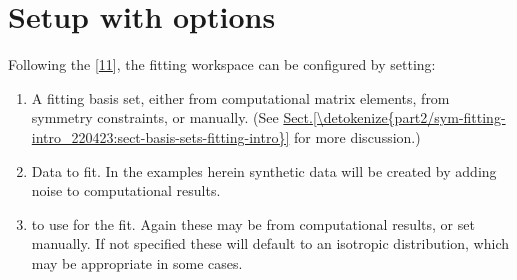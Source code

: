 \documentclass[letterpaper,table,10pt,english]{jupyterBook}
\begin{document}
\section{Setup with options}
\label{\detokenize{part2/basic_fitting_numerics_intro_260423:setup-with-options}}
\sphinxAtStartPar
Following the  {[}\hyperlink{cite.backmatter/bibliography:id617}{11}{]}, the fitting workspace can be configured by setting:
\begin{enumerate}
%
\item {} 
\sphinxAtStartPar
A fitting basis set, either from computational matrix elements, from symmetry constraints, or manually. (See \hyperref[\detokenize{part2/sym-fitting-intro_220423:sect-basis-sets-fitting-intro}]{Sect.\@ \ref{\detokenize{part2/sym-fitting-intro_220423:sect-basis-sets-fitting-intro}}} for more discussion.)

\item {} 
\sphinxAtStartPar
Data to fit. In the examples herein synthetic data will be created by adding noise to computational results.

\item {} 
\sphinxAtStartPar
{\hyperref[\detokenize{backmatter/glossary:term-ADMs}]{}} to use for the fit. Again these may be from computational results, or set manually. If not specified these will default to an isotropic distribution, which may be appropriate in some cases.

\end{enumerate}
\end{document}
